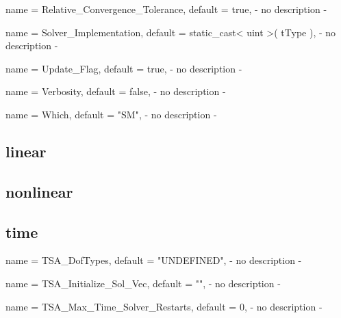 \begin{parameter}{
    name    = {Relative_Convergence_Tolerance},
    default = {true},
}
- no description -
\end{parameter}

\begin{parameter}{
    name    = {Solver_Implementation},
    default = {static_cast< uint >( tType )},
}
- no description -
\end{parameter}

\begin{parameter}{
    name    = {Update_Flag},
    default = {true},
}
- no description -
\end{parameter}

\begin{parameter}{
    name    = {Verbosity},
    default = {false},
}
- no description -
\end{parameter}

\begin{parameter}{
    name    = {Which},
    default = {"SM"},
}
- no description -
\end{parameter}

\subsection{linear}

\subsection{nonlinear}

\subsection{time}

\begin{parameter}{
    name    = {TSA_DofTypes},
    default = {"UNDEFINED"},
}
- no description -
\end{parameter}

\begin{parameter}{
    name    = {TSA_Initialize_Sol_Vec},
    default = {""},
}
- no description -
\end{parameter}

\begin{parameter}{
    name    = {TSA_Max_Time_Solver_Restarts},
    default = {0},
}
- no description -
\end{parameter}

